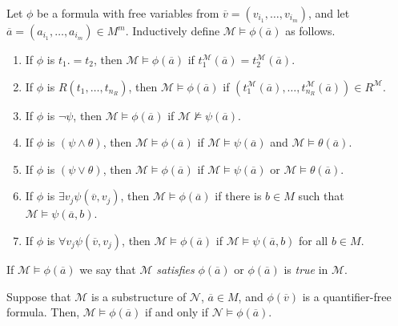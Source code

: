 \documentclass[
	fontsize=10pt, %
]{kaohandt}
\begin{document}
\begin{definition}
    Let $\phi$ be a formula with free variables from 
    $\overline{v} = (v_{i_1},\dots,v_{i_m})$, and let
    $\overline{a} = (a_{i_1},\dots,a_{i_m})\in M^m$.
    Inductively define $\mathcal{M} \models \phi(\overline{a})$ as follows.
    \begin{enumerate}[label = {\roman*)}]
        \item If $\phi$ is $t_1. = t_2$, then $\mathcal{M} \models \phi(\overline{a})$ if $t_1^{\mathcal{M}}(\overline{a}) = t_2^{\mathcal{M}}(\overline{a})$.
        \item If $\phi$ is $R(t_1,\dots,t_{n_R})$, then $\mathcal{M} \models \phi(\overline{a})$ if $(t^{\mathcal{M}}_1(\overline{a}),\dots,t^{\mathcal{M}}_{n_R}(\overline{a})) \in R^{\mathcal{M}}$.
        \item If $\phi$ is $\neg \psi$, then $\mathcal{M} \models \phi(\overline{a})$ if $\mathcal{M} \not\models \psi(\overline{a})$.
        \item If $\phi$ is $(\psi \land \theta)$, then $\mathcal{M} \models \phi(\overline{a})$ if $\mathcal{M} \models \psi(\overline{a})$ and $\mathcal{M} \models \theta(\overline{a})$.
        \item If $\phi$ is $(\psi \lor \theta)$, then $\mathcal{M} \models \phi(\overline{a})$ if $\mathcal{M} \models \psi(\overline{a})$ or $\mathcal{M} \models \theta(\overline{a})$.
        \item If $\phi$ is $\exists v_j \psi(\overline{v},v_j)$, then $\mathcal{M} \models \phi(\overline{a})$ if there is $b \in M$ such that $\mathcal{M} \models \psi(\overline{a},b)$.
        \item If $\phi$ is $\forall v_j \psi(\overline{v},v_j)$, then $\mathcal{M} \models \phi(\overline{a})$ if $\mathcal{M} \models \psi(\overline{a},b)$ for all $b \in M$.
    \end{enumerate}
    If $\mathcal{M} \models \phi(\overline{a})$ we say that
    $\mathcal{M}$ \emph{satisfies} $\phi(\overline{a})$ or $\phi(\overline{a})$ is \emph{true} in $\mathcal{M}$.
\end{definition}

\begin{proposition}
    Suppose that $\mathcal{M}$ is a substructure of $\mathcal{N}$,
    $\overline{a} \in M$, and $\phi(\overline{v})$ is a quantifier-free formula.
    Then, $\mathcal{M} \models \phi(\overline{a})$ if and only if $\mathcal{N} \models \phi(\overline{a})$.
\end{proposition}
\end{document}
